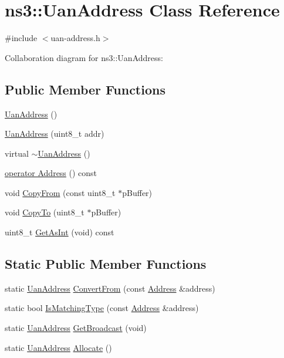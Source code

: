 \hypertarget{classns3_1_1UanAddress}{}\section{ns3\+:\+:Uan\+Address Class Reference}
\label{classns3_1_1UanAddress}


{\ttfamily \#include $<$uan-\/address.\+h$>$}



Collaboration diagram for ns3\+:\+:Uan\+Address\+:
\subsection*{Public Member Functions}
\begin{DoxyCompactItemize}
\item 
\hyperlink{classns3_1_1UanAddress_afe2a87bc58016c1943df922757353bd3}{Uan\+Address} ()
\item 
\hyperlink{classns3_1_1UanAddress_af02625edd60e78e671a1395305bae974}{Uan\+Address} (uint8\+\_\+t addr)
\item 
virtual \hyperlink{classns3_1_1UanAddress_a1f86e2471fb8924034a67a0d9f0ca76f}{$\sim$\+Uan\+Address} ()
\item 
\hyperlink{classns3_1_1UanAddress_abf6e11d533d02b97931446e5825ef51c}{operator Address} () const 
\item 
void \hyperlink{classns3_1_1UanAddress_a92bb29e6a70046099aa9f4abf9ccee5b}{Copy\+From} (const uint8\+\_\+t $\ast$p\+Buffer)
\item 
void \hyperlink{classns3_1_1UanAddress_a7599b26748c2b4af135e6ade73853701}{Copy\+To} (uint8\+\_\+t $\ast$p\+Buffer)
\item 
uint8\+\_\+t \hyperlink{classns3_1_1UanAddress_ad5cd951bc1452b19702ce6de9a47a0bd}{Get\+As\+Int} (void) const 
\end{DoxyCompactItemize}
\subsection*{Static Public Member Functions}
\begin{DoxyCompactItemize}
\item 
static \hyperlink{classns3_1_1UanAddress}{Uan\+Address} \hyperlink{classns3_1_1UanAddress_a43ffcb02795ab454a8ba0e0fdd5fdb41}{Convert\+From} (const \hyperlink{classns3_1_1Address}{Address} \&address)
\item 
static bool \hyperlink{classns3_1_1UanAddress_a55f31a50400f62e0ee9aca7b1b06a590}{Is\+Matching\+Type} (const \hyperlink{classns3_1_1Address}{Address} \&address)
\item 
static \hyperlink{classns3_1_1UanAddress}{Uan\+Address} \hyperlink{classns3_1_1UanAddress_ad3b8c69e1408b20f0536a95d70ccbeda}{Get\+Broadcast} (void)
\item 
static \hyperlink{classns3_1_1UanAddress}{Uan\+Address} \hyperlink{classns3_1_1UanAddress_ad288f3dfb464eea5b2b76828f3a1d8f0}{Allocate} ()
\end{DoxyCompactItemize}
